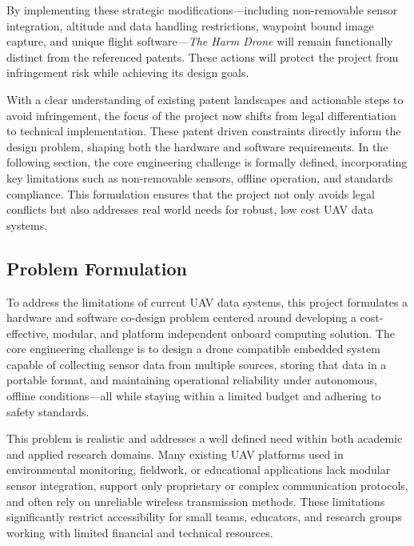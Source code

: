\documentclass[12pt]{article}
\begin{document}
\par By implementing these strategic modifications—including non-removable sensor integration, altitude and data handling restrictions, waypoint bound image capture, and unique flight software—\textit{The Harm Drone} will remain functionally distinct from the referenced patents. These actions will protect the project from infringement risk while achieving its design goals.
\par With a clear understanding of existing patent landscapes and actionable steps to avoid infringement, the focus of the project now shifts from legal differentiation to technical implementation. These patent driven constraints directly inform the design problem, shaping both the hardware and software requirements. In the following section, the core engineering challenge is formally defined, incorporating key limitations such as non-removable sensors, offline operation, and standards compliance. This formulation ensures that the project not only avoids legal conflicts but also addresses real world needs for robust, low cost UAV data systems.

\subsection{Problem Formulation}

\par To address the limitations of current UAV data systems, this project formulates a hardware and software co-design problem centered around developing a cost-effective, modular, and platform independent onboard computing solution. The core engineering challenge is to design a drone compatible embedded system capable of collecting sensor data from multiple sources, storing that data in a portable format, and maintaining operational reliability under autonomous, offline conditions—all while staying within a limited budget and adhering to safety standards.

\par This problem is realistic and addresses a well defined need within both academic and applied research domains. Many existing UAV platforms used in environmental monitoring, fieldwork, or educational applications lack modular sensor integration, support only proprietary or complex communication protocols, and often rely on unreliable wireless transmission methods. These limitations significantly restrict accessibility for small teams, educators, and research groups working with limited financial and technical resources.
\end{document}
